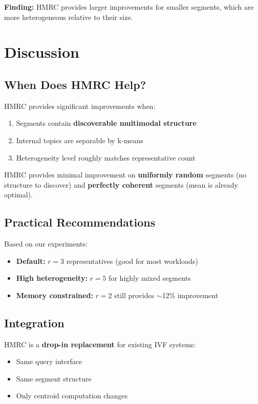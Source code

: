 \documentclass[sigconf, nonacm]{acmart}
\begin{document}
\textbf{Finding:} HMRC provides larger improvements for smaller segments, which are more heterogeneous relative to their size.


\section{Discussion}

\subsection{When Does HMRC Help?}

HMRC provides significant improvements when:
\begin{enumerate}
    \item Segments contain \textbf{discoverable multimodal structure}
    \item Internal topics are separable by k-means
    \item Heterogeneity level roughly matches representative count
\end{enumerate}

HMRC provides minimal improvement on \textbf{uniformly random} segments (no structure to discover) and \textbf{perfectly coherent} segments (mean is already optimal).

\subsection{Practical Recommendations}

Based on our experiments:
\begin{itemize}
    \item \textbf{Default:} $r=3$ representatives (good for most workloads)
    \item \textbf{High heterogeneity:} $r=5$ for highly mixed segments
    \item \textbf{Memory constrained:} $r=2$ still provides $\sim$12\% improvement
\end{itemize}

\subsection{Integration}

HMRC is a \textbf{drop-in replacement} for existing IVF systems:
\begin{itemize}
    \item Same query interface
    \item Same segment structure
    \item Only centroid computation changes
\end{itemize}
\end{document}
